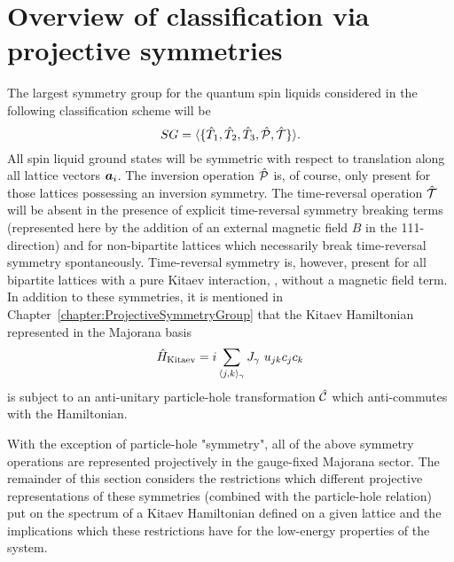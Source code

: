 \section{Overview of classification via projective symmetries}
\label{section:chapter05_Overview}
%
%
The largest symmetry group for the quantum spin liquids considered in the following classification scheme will be
%
\begin{equation}
	SG = \langle \{ \hat{T}_1, \hat{T}_2, \hat{T}_3, \hat{\mathcal{P}}, \hat{\mathcal{T}} \} \rangle.
\end{equation}
%
All spin liquid ground states will be symmetric with respect to translation along all lattice vectors $\bm{a}_i$.
The inversion operation $\hat{\mathcal{P}}$ is, of course, only present for those lattices possessing an inversion symmetry.
The time-reversal operation $\hat{\mathcal{T}}$ will be absent in the presence of explicit time-reversal symmetry breaking terms (represented here by the addition of an external magnetic field $B$ in the 111-direction) and for non-bipartite lattices which necessarily break time-reversal symmetry spontaneously.
Time-reversal symmetry is, however, present for all bipartite lattices with a pure Kitaev interaction, \ie, without a magnetic field term.
In addition to these symmetries, it is mentioned in Chapter~\ref{chapter:ProjectiveSymmetryGroup} that the Kitaev Hamiltonian represented in the Majorana basis
%
\begin{equation}
	\hat{H}_{\rm Kitaev} = i \sum_{\langle j,k \rangle_{\gamma}} J_{\gamma}~u_{jk} c_j c_k
	\label{eq:chapter05_KitaevHamiltonianMajorana}
\end{equation}
%
is subject to an anti-unitary particle-hole transformation $\hat{\mathcal{C}}$ which anti-commutes with the Hamiltonian.

With the exception of particle-hole "symmetry", all of the above symmetry operations are represented projectively in the gauge-fixed Majorana sector.
The remainder of this section considers the restrictions which different projective representations of these symmetries (combined with the particle-hole relation) put on the spectrum of a Kitaev Hamiltonian defined on a given lattice and the implications which these restrictions have for the low-energy properties of the system.


